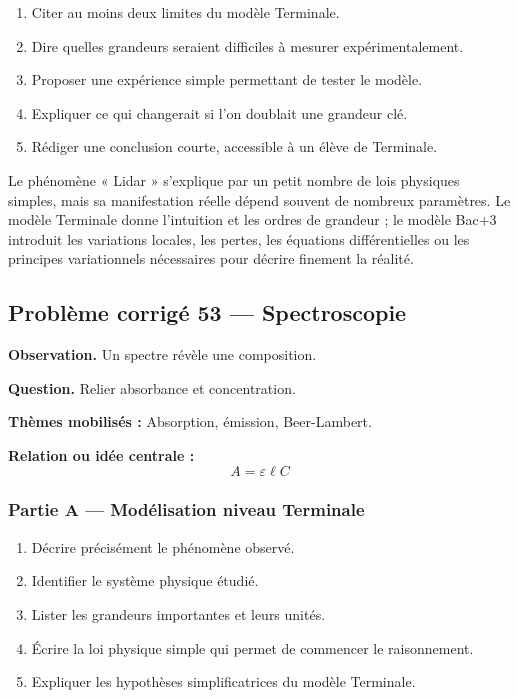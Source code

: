 \documentclass[11pt,a4paper]{article}
\begin{document}
\begin{enumerate}
  \item Citer au moins deux limites du modèle Terminale.
  \item Dire quelles grandeurs seraient difficiles à mesurer expérimentalement.
  \item Proposer une expérience simple permettant de tester le modèle.
  \item Expliquer ce qui changerait si l'on doublait une grandeur clé.
  \item Rédiger une conclusion courte, accessible à un élève de Terminale.
\end{enumerate}

\begin{corrigebox}
Le phénomène « Lidar » s'explique par un petit nombre de lois physiques simples, mais sa manifestation réelle dépend souvent de nombreux paramètres. Le modèle Terminale donne l'intuition et les ordres de grandeur ; le modèle Bac+3 introduit les variations locales, les pertes, les équations différentielles ou les principes variationnels nécessaires pour décrire finement la réalité.
\end{corrigebox}

\subsection{Problème corrigé 53 — Spectroscopie}

\begin{exercicebox}
\textbf{Observation.} Un spectre révèle une composition.

\medskip
\textbf{Question.} Relier absorbance et concentration.

\medskip
\textbf{Thèmes mobilisés :} Absorption, émission, Beer-Lambert.

\medskip
\textbf{Relation ou idée centrale :}
\[
A=\varepsilon\ell C
\]
\end{exercicebox}

\subsubsection*{Partie A — Modélisation niveau Terminale}

\begin{enumerate}
  \item Décrire précisément le phénomène observé.
  \item Identifier le système physique étudié.
  \item Lister les grandeurs importantes et leurs unités.
  \item Écrire la loi physique simple qui permet de commencer le raisonnement.
  \item Expliquer les hypothèses simplificatrices du modèle Terminale.
\end{enumerate}
\end{document}
